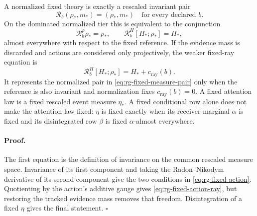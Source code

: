 A normalized fixed theory is exactly a rescaled invariant pair
\begin{equation}
\mathcal R_b(\rho_*,m_*)=(\rho_*,m_*)
\quad\text{for every declared }b.
\label{eq:rg-fixed-measure-pair}
\end{equation}
On the dominated normalized tier this is equivalent to the conjunction
\begin{equation}
\mathcal R_b^\rho\rho_*=\rho_*,
\qquad
\mathcal R_b^H[H_*;\rho_*]=H_*,
\label{eq:rg-fixed-action}
\end{equation}
almost everywhere with respect to the fixed reference.  If the evidence mass
is discarded and actions are considered only projectively, the weaker
fixed-ray equation is
\begin{equation}
\mathcal R_b^H[H_*;\rho_*]=H_*+c_{\mathrm{ray}}(b).
\label{eq:rg-fixed-action-ray}
\end{equation}
It represents the normalized pair in \eqref{eq:rg-fixed-measure-pair} only when
the reference is also invariant and normalization fixes
$c_{\mathrm{ray}}(b)=0$.  A fixed
attention law is a fixed rescaled event measure $\eta_*$.  A fixed conditional
row alone does not make the attention law fixed: $\eta$ is fixed exactly when
its receiver marginal $\alpha$ is fixed and its disintegrated row $\beta$ is
fixed $\alpha$-almost everywhere.  

\paragraph{Proof.}
The first equation is the definition of invariance on the common rescaled
measure space.  Invariance of its first component and taking the
Radon--Nikodym derivative of its second component give the two conditions in
\eqref{eq:rg-fixed-action}.  Quotienting by the action's additive gauge gives
\eqref{eq:rg-fixed-action-ray}, but restoring the tracked evidence mass removes
that freedom.  Disintegration of a fixed $\eta$ gives the final statement.
$\square$

